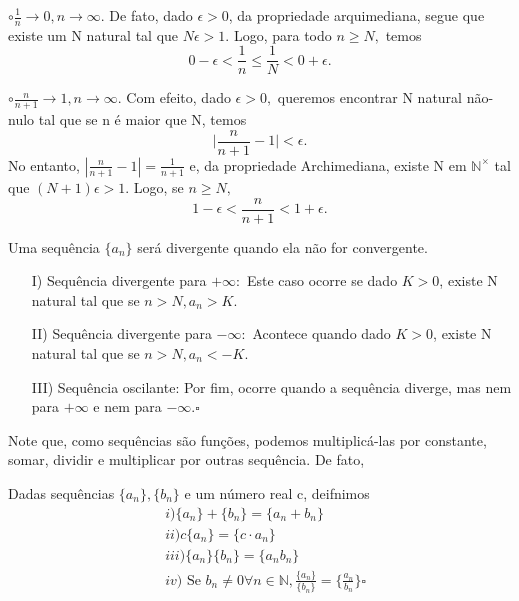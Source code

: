 \documentclass[analysis_notes.tex]{subfiles}
\begin{document}
\begin{example}
	$\circ{}\frac{1}{n}\rightarrow0, n\rightarrow\infty$. De fato, dado $\epsilon > 0$, da propriedade arquimediana, segue que
	existe um N natural tal que $N\epsilon > 1.$ Logo, para todo $n\geq{N},$ temos
	$$
		0 - \epsilon < \frac{1}{n}\leq{\frac{1}{N}} < 0 + \epsilon.
	$$

	$\circ \frac{n}{n+1}\rightarrow 1, n\rightarrow\infty$. Com efeito, dado $\epsilon > 0,$ queremos encontrar N natural n\~ao-nulo tal que
	se n \'e maior que N, temos
	$$
		\biggl|\frac{n}{n+1} - 1\biggr| < \epsilon.
	$$
	No entanto, $|\frac{n}{n+1}-1| = \frac{1}{n+1}$ e, da propriedade Archimediana, existe N em $\mathbb{N}^{\times}$ tal que
	$(N+1)\epsilon > 1$. Logo, se $n\geq{N},$
	$$
		1 - \epsilon < \frac{n}{n+1} < 1 + \epsilon.
	$$
\end{example}
\begin{def*}
	Uma sequ\^encia $\{a_{n}\}$ ser\'a divergente quando ela n\~ao for convergente.
	\begin{itemize}
		\item[I)] Sequ\^encia divergente para $+\infty:$ Este caso ocorre se dado $K > 0$, existe N natural tal que se $n > N,
			      a_{n} > K.$
		\item[II)] Sequ\^encia divergente para $-\infty:$ Acontece quando dado $K > 0$, existe N natural tal que se $n > N,
			      a_{n} < -K.$
		\item[III)]Sequ\^encia oscilante: Por fim, ocorre quando a sequ\^encia diverge, mas nem para $+\infty$ e nem para $-\infty.\square$
	\end{itemize}
\end{def*}
Note que, como sequ\^encias s\~ao fun\c c\~oes, podemos multiplic\'a-las por constante, somar, dividir e multiplicar por outras sequ\^encia. De fato,
\begin{def*}
	Dadas sequ\^encias $\{a_{n}\}, \{b_{n}\}$ e um n\'umero real c, deifnimos
	\begin{align*}
		 & i) \{a_{n}\} + \{b_{n}\} = \{a_{n} + b_{n}\}                                                                               \\
		 & ii) c\{a_{n}\} = \{c \cdot a_{n}\}                                                                                         \\
		 & iii) \{a_{n}\}\{b_{n}\} = \{a_{n}b_{n}\}                                                                                   \\
		 & iv) \text{ Se }b_{n}\neq0\forall n\in \mathbb{N}, \frac{\{a_{n}\}}{\{b_{n}\}} = \biggl\{\frac{a_{n}}{b_{n}}\biggr\}\square
	\end{align*}
\end{def*}
\end{document}
